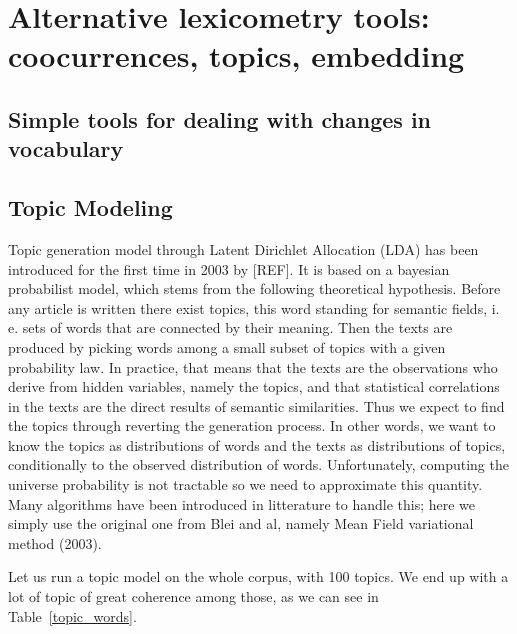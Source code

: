 \documentclass[a4paper,11pt]{article}
\begin{document}

\section{Alternative lexicometry tools: coocurrences, topics, embedding}

\subsection*{Simple tools for dealing with changes in vocabulary}

\subsection*{Topic Modeling}

Topic generation model through Latent Dirichlet Allocation (LDA) has been introduced for the first time in 2003 by [REF]. It is based on a bayesian probabilist model, which stems from the following theoretical hypothesis. Before any article is written there exist topics, this word standing for semantic fields, i. e. sets of words that are connected by their meaning. Then the texts are produced by picking words among a small subset of topics with a given probability law. In practice, that means that the texts are the observations who derive from hidden variables, namely the topics, and that statistical correlations in the texts are the direct results of semantic similarities. Thus we expect to find the topics through reverting the generation process. In other words, we want to know the topics as distributions of words and the texts as distributions of topics, conditionally to the observed distribution of words. Unfortunately, computing the universe probability is not tractable so we need to approximate this quantity. Many algorithms have been introduced in litterature to handle this; here we simply use the original one from Blei and al, namely Mean Field variational method (2003).

Let us run a topic model on the whole corpus, with 100 topics. We end up with a lot of topic of great coherence among those, as we can see in Table~\ref{topic_words}.
\end{document}
